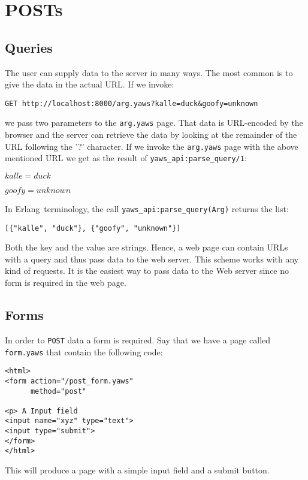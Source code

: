 \documentclass[11pt,oneside,english]{book}
\newcommand{\Erlang}            %
        {{\sc Erlang}}
\begin{document}
\section{POSTs}

\subsection{Queries}

The user can supply data to the server in many ways. The most
common is to give the data in the actual URL.
If we invoke:

\verb+GET http://localhost:8000/arg.yaws?kalle=duck&goofy=unknown+

we pass two parameters to the \verb+arg.yaws+ page.  That data is
URL-encoded by the browser and the server can retrieve the data by
looking at the remainder of the URL following the '?' character.  If
we invoke the \verb+arg.yaws+ page with the above mentioned URL we get
as the result of \verb+yaws_api:parse_query/1+:

$kalle = duck$

$goofy = unknown$

In \Erlang\  terminology, the call \verb+yaws_api:parse_query(Arg)+ returns
the list:
\begin{verbatim}
[{"kalle", "duck"}, {"goofy", "unknown"}]
\end{verbatim}

Both the key and the value are strings. Hence, a web page can contain URLs with
a query and thus pass data to the web server. This scheme works with any kind of
requests. It is the easiest way to pass data to the Web server since no form is
required in the web page.


\subsection{Forms}

In order to \verb+POST+ data a form is required. Say that we have a
page called \verb+form.yaws+ that contain the following code:

\begin{verbatim}
<html>
<form action="/post_form.yaws"
      method="post"

<p> A Input field
<input name="xyz" type="text">
<input type="submit">
</form>
</html>
\end{verbatim}

This will produce a page with a simple input field and a submit button.
\end{document}
